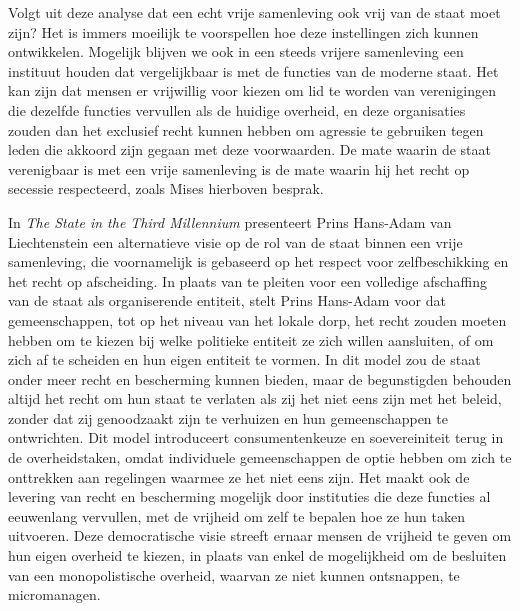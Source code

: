 Volgt uit deze analyse dat een echt vrije samenleving ook vrij van de staat moet zijn? Het is immers moeilijk te voorspellen hoe deze instellingen zich kunnen ontwikkelen. Mogelijk blijven we ook in een steeds vrijere samenleving een instituut houden dat vergelijkbaar is met de functies van de moderne staat. Het kan zijn dat mensen er vrijwillig voor kiezen om lid te worden van verenigingen die dezelfde functies vervullen als de huidige overheid, en deze organisaties zouden dan het exclusief recht kunnen hebben om agressie te gebruiken tegen leden die akkoord zijn gegaan met deze voorwaarden. De mate waarin de staat verenigbaar is met een vrije samenleving is  de mate waarin hij het recht op secessie respecteerd, zoals Mises hierboven besprak.

In \emph{The State in the Third Millennium} presenteert Prins Hans-Adam van Liechtenstein een alternatieve visie op de rol van de staat binnen een vrije samenleving, die voornamelijk is gebaseerd op het respect voor zelfbeschikking en het recht op afscheiding.\autocite{211} In plaats van te pleiten voor een volledige afschaffing van de staat als organiserende entiteit, stelt Prins Hans-Adam voor dat gemeenschappen, tot op het niveau van het lokale dorp, het recht zouden moeten hebben om te kiezen bij welke politieke entiteit ze zich willen aansluiten, of om zich af te scheiden en hun eigen entiteit te vormen. In dit model zou de staat onder meer recht en bescherming kunnen bieden, maar de begunstigden behouden altijd het recht om hun staat te verlaten als zij het niet eens zijn met het beleid, zonder dat zij genoodzaakt zijn te verhuizen en hun gemeenschappen te ontwrichten. Dit model introduceert consumentenkeuze en soevereiniteit terug in de overheidstaken, omdat individuele gemeenschappen de optie hebben om zich te onttrekken aan regelingen waarmee ze het niet eens zijn. Het maakt ook de levering van recht en bescherming mogelijk door instituties die deze functies al eeuwenlang vervullen, met de vrijheid om zelf te bepalen hoe ze hun taken uitvoeren. Deze democratische visie streeft ernaar mensen de vrijheid te geven om hun eigen overheid te kiezen, in plaats van enkel de mogelijkheid om de besluiten van een monopolistische overheid, waarvan ze niet kunnen ontsnappen, te micromanagen.

